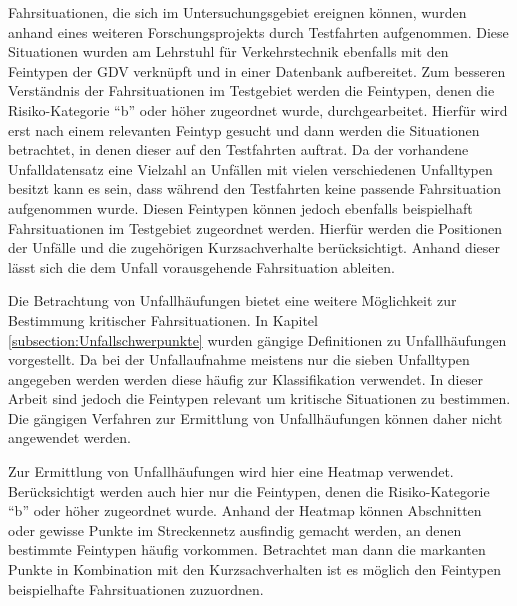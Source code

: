 Fahrsituationen, die sich im Untersuchungsgebiet ereignen können, wurden anhand eines weiteren Forschungsprojekts durch Testfahrten aufgenommen. Diese Situationen wurden am Lehrstuhl für Verkehrstechnik ebenfalls mit den Feintypen der GDV verknüpft und in einer Datenbank aufbereitet. Zum besseren Verständnis der Fahrsituationen im Testgebiet werden die Feintypen, denen die Risiko-Kategorie \enquote{b} oder höher zugeordnet wurde, durchgearbeitet. Hierfür wird erst nach einem relevanten Feintyp gesucht und dann werden die Situationen betrachtet, in denen dieser auf den Testfahrten auftrat. Da der vorhandene Unfalldatensatz eine Vielzahl an Unfällen mit vielen verschiedenen Unfalltypen besitzt kann es sein, dass während den Testfahrten keine passende Fahrsituation aufgenommen wurde. Diesen Feintypen können jedoch ebenfalls beispielhaft Fahrsituationen im Testgebiet zugeordnet werden. Hierfür werden die Positionen der Unfälle und die zugehörigen Kurzsachverhalte berücksichtigt. Anhand dieser lässt sich die dem Unfall vorausgehende Fahrsituation ableiten.

Die Betrachtung von Unfallhäufungen bietet eine weitere Möglichkeit zur Bestimmung kritischer Fahrsituationen. In Kapitel \ref{subsection:Unfallschwerpunkte} wurden gängige Definitionen zu Unfallhäufungen vorgestellt. Da bei der Unfallaufnahme meistens nur die sieben Unfalltypen angegeben werden werden diese häufig  zur Klassifikation verwendet. In dieser Arbeit sind jedoch die Feintypen relevant um kritische Situationen zu bestimmen. Die gängigen Verfahren zur Ermittlung von Unfallhäufungen können daher nicht angewendet werden.

Zur Ermittlung von Unfallhäufungen wird hier eine Heatmap verwendet. Berücksichtigt werden auch hier nur die Feintypen, denen die Risiko-Kategorie \enquote{b} oder höher zugeordnet wurde. Anhand der Heatmap können Abschnitten oder gewisse Punkte im Streckennetz ausfindig gemacht werden, an denen bestimmte Feintypen häufig vorkommen. Betrachtet man dann die markanten Punkte in Kombination mit den Kurzsachverhalten ist es möglich den Feintypen beispielhafte Fahrsituationen zuzuordnen.
